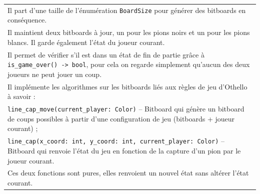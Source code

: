 \documentclass[a4paper,12pt]{article}
\begin{document}
\begin{tabularx}{\textwidth}{|X|}
    Il part d’une taille de l’énumération \texttt{BoardSize} pour générer des bitboards en conséquence.                                                                                                                                                                                                                                                                                      \\
    Il maintient deux bitboards à jour, un pour les pions noirs et un pour les pions blancs. Il garde également l’état du joueur courant.                                                                                                                                                                                                                                                    \\
    Il permet de vérifier s’il est dans un état de fin de partie grâce à \texttt{is\_game\_over() -> bool}, pour cela on regarde simplement qu’aucun des deux joueurs ne peut jouer un coup.                                                                                                                                                                                                 \\
    Il implémente les algorithmes sur les bitboards liés aux règles de jeu d’Othello à savoir :                                                                                                                                                                                                                                                                                              \\
    \texttt{line\_cap\_move(current\_player: Color)} -- Bitboard qui génère un bitboard de coups possibles à partir d’une configuration de jeu (bitboards + joueur courant) ;                                                                                                                                                                                                                \\
    \texttt{line\_cap(x\_coord: int, y\_coord: int, current\_player: Color)} -- Bitboard qui renvoie l’état du jeu en fonction de la capture d’un pion par le joueur courant.                                                                                                                                                                                                                \\
    Ces deux fonctions sont pures, elles renvoient un nouvel état sans altérer l’état courant.                                                                                                                                                                                                                                                                                               \\

\end{tabularx}
\end{document}

